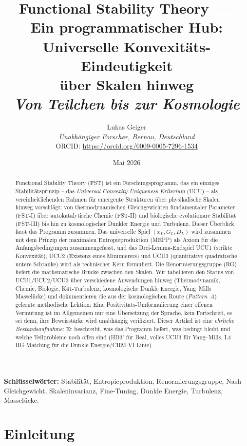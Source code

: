 \documentclass[11pt,a4paper]{article}
\title{Functional Stability Theory \,---\,\\
Ein programmatischer Hub:\\
Universelle Konvexitäts-Eindeutigkeit\\
über Skalen hinweg\\[0.5em]
\large\textit{Von Teilchen bis zur Kosmologie}}
\author{Lukas Geiger\\
\textit{Unabhängiger Forscher, Bernau, Deutschland}\\
ORCID: \url{https://orcid.org/0009-0005-7296-1534}}
\date{Mai 2026}
\theoremstyle{remark}
\begin{document}
\maketitle

\begin{abstract}
\noindent
Functional Stability Theory (FST) ist ein Forschungsprogramm, das ein einziges Stabilitätsprinzip -- das \emph{Universal Convexity-Uniqueness Kriterium} (UCU) -- als vereinheitlichenden Rahmen für emergente Strukturen über physikalische Skalen hinweg vorschlägt: von thermodynamischen Gleichgewichten fundamentaler Parameter (FST-I) über autokatalytische Chemie (FST-II) und biologische evolutionäre Stabilität (FST-III) bis hin zu kosmologischer Dunkler Energie und Turbulenz. Dieser Überblick fasst das Programm zusammen. Das universelle Spiel $(x_L, G_L, D_L)$ wird zusammen mit dem Prinzip der maximalen Entropieproduktion (MEPP) als Axiom für die Anfangsbedingungen zusammengefasst, und das Drei-Lemma-Endspiel UCU1 (strikte Konvexität), UCU2 (Existenz eines Minimierers) und UCU3 (quantitative quadratische untere Schranke) wird als technischer Kern formuliert. Die Renormierungsgruppe (RG) liefert die mathematische Brücke zwischen den Skalen. Wir tabellieren den Status von UCU1/UCU2/UCU3 über verschiedene Anwendungen hinweg (Thermodynamik, Chemie, Biologie, K41-Turbulenz, kosmologische Dunkle Energie, Yang--Mills Masselücke) und dokumentieren die aus der kosmologischen Route (\emph{Pattern~A}) gelernte methodische Lektion: Eine Positivitäts-Umformulierung einer offenen Vermutung ist im Allgemeinen nur eine Übersetzung der Sprache, kein Fortschritt, es sei denn, ihre Beweisstärke wird unabhängig verifiziert. Dieser Artikel ist eine \emph{ehrliche Bestandsaufnahme}: Er beschreibt, was das Programm liefert, was bedingt bleibt und welche Teilprobleme noch offen sind (HD3' für Beal, volles UCU3 für Yang--Mills, L4 RG-Matching für die Dunkle Energie/CRM-VI Linie).
\end{abstract}

\textbf{Schlüsselwörter:} Stabilität, Entropieproduktion, Renormierungsgruppe,
Nash-Gleichgewicht, Skaleninvarianz, Fine-Tuning, Dunkle Energie,
Turbulenz, Masselücke.

\section{Einleitung}
\label{sec:intro}
\end{document}
